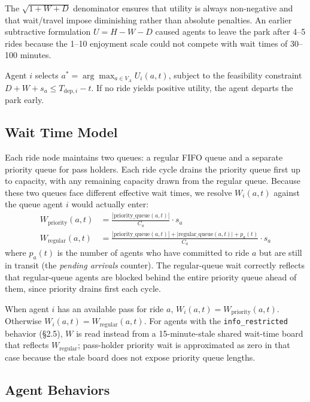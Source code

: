 \documentclass[11pt]{article}
\begin{document}
The $\sqrt{1 + W + D}$ denominator ensures that utility is always non-negative and that wait/travel impose diminishing rather than absolute penalties. An earlier subtractive formulation $U = H - W - D$ caused agents to leave the park after 4--5 rides because the 1--10 enjoyment scale could not compete with wait times of 30--100 minutes.

Agent $i$ selects $a^* = \arg\max_{a \in V_A} U_i(a, t)$, subject to the feasibility constraint $D + W + s_a \leq T_{\text{dep},i} - t$. If no ride yields positive utility, the agent departs the park early.

\subsection{Wait Time Model}

Each ride node maintains two queues: a regular FIFO queue and a separate priority queue for pass holders. Each ride cycle drains the priority queue first up to capacity, with any remaining capacity drawn from the regular queue. Because these two queues face different effective wait times, we resolve $W_i(a, t)$ against the queue agent $i$ would actually enter:
\begin{align*}
W_{\text{priority}}(a, t) &= \frac{|\text{priority\_queue}(a, t)|}{C_a} \cdot s_a \\[4pt]
W_{\text{regular}}(a, t) &= \frac{|\text{priority\_queue}(a, t)| + |\text{regular\_queue}(a, t)| + p_a(t)}{C_a} \cdot s_a
\end{align*}
where $p_a(t)$ is the number of agents who have committed to ride $a$ but are still in transit (the \emph{pending arrivals} counter). The regular-queue wait correctly reflects that regular-queue agents are blocked behind the entire priority queue ahead of them, since priority drains first each cycle.

When agent $i$ has an available pass for ride $a$, $W_i(a, t) = W_{\text{priority}}(a, t)$. Otherwise $W_i(a, t) = W_{\text{regular}}(a, t)$. For agents with the \texttt{info\_restricted} behavior (\S2.5), $W$ is read instead from a 15-minute-stale shared wait-time board that reflects $W_{\text{regular}}$; pass-holder priority wait is approximated as zero in that case because the stale board does not expose priority queue lengths.

\subsection{Agent Behaviors}
\end{document}
